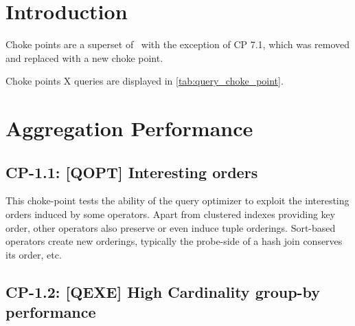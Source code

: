 
\section*{Introduction}

Choke points are a superset of~\cite{LdbcDeliverable} with the exception of CP 7.1, which was removed and replaced with a new choke point.

Choke points X queries are displayed in \autoref{tab:query_choke_point}.

{
\setlength{\tabcolsep}{.1em}

}


\section{Aggregation Performance}

\subsection*{CP-1.1: [QOPT] Interesting orders}
\label{choke_point_1.1}


This choke-point tests the ability of the query optimizer to exploit the interesting orders induced by some operators. Apart from clustered indexes providing key order, other operators also preserve or even induce tuple orderings.
Sort-based operators create new orderings, typically the probe-side of a hash join conserves its order, etc.



\subsection*{CP-1.2: [QEXE] High Cardinality group-by performance}
\label{choke_point_1.2}


